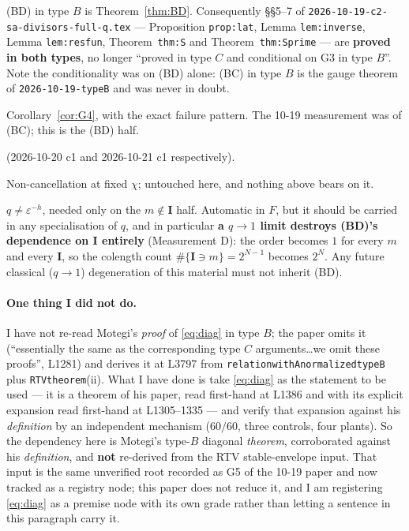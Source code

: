 \documentclass[11pt]{article}
\theoremstyle{definition}
\theoremstyle{remark}
\newcommand{\bI}{\mathbf{I}}
\begin{document}
\begin{description}[leftmargin=1.4em]
\item[G3 --- CLOSED.]  (BD) in type $B$ is Theorem~\ref{thm:BD}.  Consequently
  \S\S5--7 of \texttt{2026-10-19-c2-sa-divisors-full-q.tex} --- Proposition
  \texttt{prop:lat}, Lemma \texttt{lem:inverse}, Lemma \texttt{lem:resfun},
  Theorem~\texttt{thm:S} and Theorem~\texttt{thm:Sprime} --- are \textbf{proved in both
  types}, no longer ``proved in type $C$ and conditional on G3 in type $B$''.  Note the
  conditionality was on (BD) alone: (BC) in type $B$ is the gauge theorem of
  \texttt{2026-10-19-typeB} and was never in doubt.
\item[G4 --- upgraded from measured to derived.]  Corollary~\ref{cor:G4}, with the exact
  failure pattern.  The 10-19 measurement was of (BC); this is the (BD) half.
\item[G1, G5 --- already closed] (2026-10-20 c1 and 2026-10-21 c1 respectively).
\item[G2 --- still open.]  Non-cancellation at fixed $\chi$; untouched here, and
  nothing above bears on it.
\item[A new hypothesis, replacing a withdrawn one.]  $q\ne\varepsilon^{-h}$, needed only
  on the $m\notin\bI$ half.  Automatic in $F$, but it should be carried in any
  specialisation of $q$, and in particular \textbf{a $q\to1$ limit destroys (BD)'s
  dependence on $\bI$ entirely} (Measurement D): the order becomes $1$ for every $m$ and
  every $\bI$, so the colength count $\#\{\bI\ni m\}=2^{N-1}$ becomes $2^{N}$.  Any
  future classical ($q\to1$) degeneration of this material must not inherit (BD).
\end{description}

\paragraph{One thing I did not do.}
I have not re-read Motegi's \emph{proof} of \eqref{eq:diag} in type $B$; the paper omits
it (``essentially the same as the corresponding type $C$ arguments\ldots we omit these
proofs'', L1281) and derives it at L3797 from \texttt{relationwithAnormalizedtypeB} plus
\texttt{RTVtheorem}(ii).  What I have done is take \eqref{eq:diag} as the statement to
be used --- it is a theorem of his paper, read first-hand at L1386 and with its explicit
expansion read first-hand at L1305--1335 --- and verify that expansion against his
\emph{definition} by an independent mechanism ($60/60$, three controls, four plants).
So the dependency here is Motegi's type-$B$ diagonal \emph{theorem}, corroborated
against his \emph{definition}, and \textbf{not} re-derived from the RTV stable-envelope
input.  That input is the same unverified root recorded as G5 of the 10-19 paper and now
tracked as a registry node; this paper does not reduce it, and I am registering
\eqref{eq:diag} as a premise node with its own grade rather than letting a sentence in
this paragraph carry it.
\end{document}
